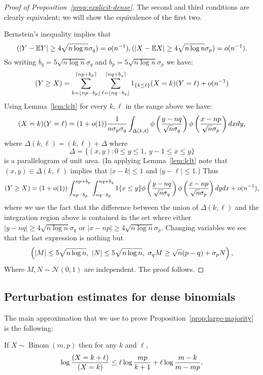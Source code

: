 \documentclass[EJP,final]{ejpecp}
\newcommand{\E}{\mathbb{E}}
\newcommand{\1}[1]{\mathbbm{1}_{\{#1\}}}
\newcommand{\normal}{\mathcal{N}}
\let\Pr\relax
\DeclareMathOperator{\Pr}{Pr}
\DeclareMathOperator{\Binom}{Binom}
\begin{document}
\begin{proof}[Proof of Proposition~\ref{prop:explicit-dense}]
The second and third conditions are clearly equivalent; we will show
the equivalence of the first two.

Bernstein's inequality implies that
\[
\Pr(|Y-\E Y| \geq 4 \sqrt{n \log n} \sigma_q) = o(n^{-1}),
\Pr(|X-\E X| \geq 4 \sqrt{n \log n} \sigma_p) = o(n^{-1}).
\]
So writing $b_q = 5 \sqrt{n \log n} \sigma_q$ and $b_p = 5 \sqrt{n \log n} \sigma_p$ we have:
\[
\Pr(Y \geq X) =
\sum_{k = \lfloor np - b_p \rfloor}^{\lceil np + b_p \rceil} \sum_{\ell = \lfloor nq - b_q\rfloor}^{\lceil nq + b_q \rceil} 1_{\{k \leq \ell\}}
\Pr(X = k) \Pr(Y = \ell) +o(n^{-1})
\]
Using Lemma~\ref{lem:lclt} for every $k,\ell$ in the range above we have:
\[
\Pr(X = k) \Pr(Y = \ell) = (1+o(1)) \frac{1}{n \sigma_p \sigma_q}
\int_{\Delta(k,\ell)} \phi \left( \frac{y-nq}{\sqrt{n} \sigma_q} \right)
\phi \left( \frac{x-np}{\sqrt{n} \sigma_p} \right) dx dy,
\]
where $\Delta(k,\ell) = (k,\ell) + \Delta$ where
\[
\Delta = \{ (x,y) : 0 \leq y \leq 1, \ y-1 \le x \le y \}
\]
is a parallelogram of unit area. (In applying Lemma~\ref{lem:lclt}
  note that $(x, y) \in \Delta(k, \ell)$ implies that
$|x - k| \le 1$ and $|y - \ell| \le 1$.)
Thus
\[
\Pr(Y \geq X) =
(1+o(1)) \int_{np - b_p}^{np + b_p} \int_{nq - b_p}^{nq + b_q}
1{\{x \le y\}}
\phi \left( \frac{y-nq}{\sqrt{n} \sigma_q} \right)
\phi \left( \frac{x-np}{\sqrt{n} \sigma_p} \right) dy dx + o(n^{-1}),
\]
where we use the fact that the difference between the union of $\Delta(k,\ell)$ and
the integration region above is contained in the set where either
$|y-nq| \geq 4 \sqrt{n \log n} \sigma_q$ or $|x-np| \geq 4 \sqrt{n \log n} \sigma_p$.
Changing variables we see that the last expression is nothing but
\[
\Pr\left( |M| \leq 5 \sqrt{n \log n}, \ |N| \leq 5 \sqrt{n \log n}, \ 
\sigma_q M \geq \sqrt{n}(p-q) + \sigma_p N\right),
\]
Where $M,N \sim \normal(0,1)$ are independent. The proof follows.
\end{proof}

\subsection{Perturbation estimates for dense binomials}

The main approximation that we use to prove
Proposition~\ref{prop:large-majority} is the following:
\begin{lemma}\label{lem:ratio}
  If $X \sim \Binom(m, p)$ then for any $k$ and $\ell$,
 \[
  \log \frac{\Pr(X = k + \ell)}{\Pr(X = k)} \le
  \ell \log \frac{mp}{k+1} + \ell \log \frac{m-k}{m-mp}.
 \]
\end{lemma}
\end{document}
